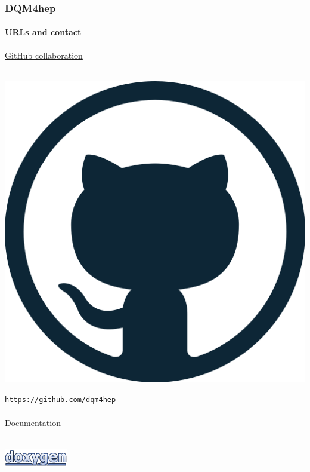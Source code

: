 \documentclass[presentation, 10pt]{beamer}
\begin{document}
\begin{frame}
  \frametitle{DQM4hep}
  \framesubtitle{URLs and contact}
  \footnotesize
  \underline{GitHub collaboration}\\
  \vspace*{0.1cm}
  ~~~
  \begin{minipage}{0.03\linewidth}
    \includegraphics[width=\linewidth]{figs/github-logo.png}
  \end{minipage}
  \href{https://github.com/dqm4hep}{\tt https://github.com/dqm4hep} \\
  ~\\
  \underline{Documentation} \\
  \vspace*{0.1cm}
  ~~~
  \begin{minipage}{0.1\linewidth}
    \includegraphics[width=\linewidth]{figs/doxygen-logo.png}
  \end{minipage}

\end{frame}
\end{document}

